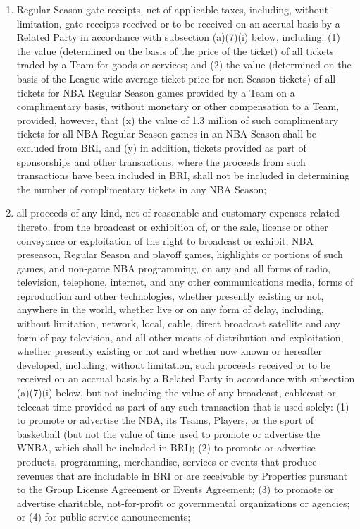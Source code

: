 \documentclass[
]{book}
\providecommand{\tightlist}{%
  \setlength{\itemsep}{0pt}\setlength{\parskip}{0pt}}
\begin{document}
\begin{enumerate}
\begin{enumerate}
    \begin{enumerate}
    \def\labelenumiii{(\roman{enumiii})}
    \tightlist
    \item
      Regular Season gate receipts, net of applicable taxes, including, without limitation, gate receipts received or to be received on an accrual basis by a Related Party in accordance with subsection (a)(7)(i) below, including: (1) the value (determined on the basis of the price of the ticket) of all tickets traded by a Team for goods or services; and (2) the value (determined on the basis of the League-wide average ticket price for non-Season tickets) of all tickets for NBA Regular Season games provided by a Team on a complimentary basis, without monetary or other compensation to a Team, provided, however, that (x) the value of 1.3 million of such complimentary tickets for all NBA Regular Season games in an NBA Season shall be excluded from BRI, and (y) in addition, tickets provided as part of sponsorships and other transactions, where the proceeds from such transactions have been included in BRI, shall not be included in determining the number of complimentary tickets in any NBA Season;
    \item
      all proceeds of any kind, net of reasonable and customary expenses related thereto, from the broadcast or exhibition of, or the sale, license or other conveyance or exploitation of the right to broadcast or exhibit, NBA preseason, Regular Season and playoff games, highlights or portions of such games, and non-game NBA programming, on any and all forms of radio, television, telephone, internet, and any other communications media, forms of reproduction and other technologies, whether presently existing or not, anywhere in the world, whether live or on any form of delay, including, without limitation, network, local, cable, direct broadcast satellite and any form of pay television, and all other means of distribution and exploitation, whether presently existing or not and whether now known or hereafter developed, including, without limitation, such proceeds received or to be received on an accrual basis by a Related Party in accordance with subsection (a)(7)(i) below, but not including the value of any broadcast, cablecast or telecast time provided as part of any such transaction that is used solely: (1) to promote or advertise the NBA, its Teams, Players, or the sport of basketball (but not the value of time used to promote or advertise the WNBA, which shall be included in BRI); (2) to promote or advertise products, programming, merchandise, services or events that produce revenues that are includable in BRI or are receivable by Properties pursuant to the Group License Agreement or Events Agreement; (3) to promote or advertise charitable, not-for-profit or governmental organizations or agencies; or (4) for public service announcements;

\end{enumerate}
\end{enumerate}
\end{enumerate}
\end{document}
